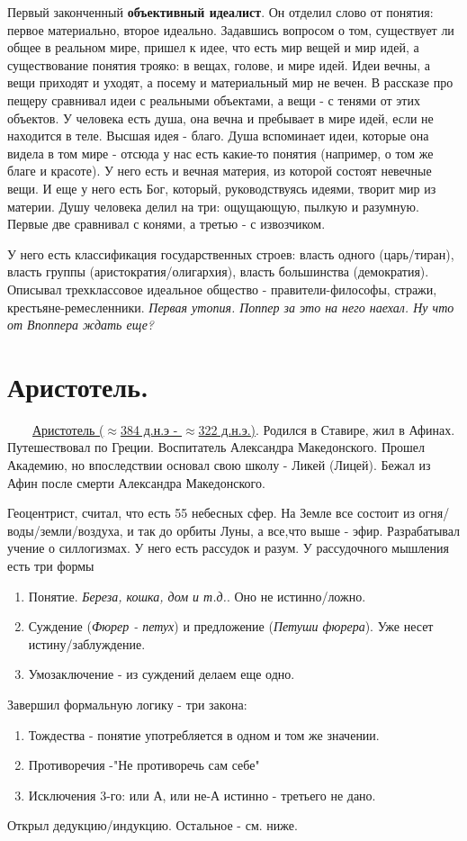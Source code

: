 \documentclass[12pt,a4paper]{article}
\begin{document}
Первый законченный \textbf{объективный идеалист}. Он отделил слово от понятия: первое материально, второе идеально. Задавшись вопросом о том, существует ли общее в реальном мире, пришел к идее, что есть мир вещей и мир идей, а существование понятия трояко: в вещах, голове, и мире идей. Идеи вечны, а вещи приходят и уходят, а посему и материальный мир не вечен. В рассказе про пещеру сравнивал идеи с реальными объектами, а вещи - с тенями от этих объектов. У человека есть душа, она вечна и пребывает в мире идей, если не находится в теле. Высшая идея - благо. Душа вспоминает идеи, которые она видела в том мире - отсюда у нас есть какие-то понятия (например, о том же благе и красоте).
У него есть и вечная материя, из которой состоят невечные вещи. И еще у него есть Бог, который, руководствуясь идеями, творит мир из материи. Душу человека делил на три: ощущающую, пылкую и разумную. Первые две сравнивал с конями, а третью - с извозчиком.

У него есть классификация государственных строев: власть одного (царь/тиран), власть группы (аристократия/олигархия), власть большинства (демократия). Описывал трехклассовое идеальное общество - правители-философы, стражи, крестьяне-ремесленники. \textit{Первая утопия. Поппер за это на него наехал. Ну что от Впоппера ждать еще?}

\section{Аристотель.}
\ \ \ \
\underline{Аристотель ($\approx$384 д.н.э - $\approx$322 д.н.э.)}. Родился в Ставире, жил в Афинах. Путешествовал по Греции. Воспитатель Александра Македонского. Прошел Академию, но впоследствии основал свою школу - Ликей (Лицей). Бежал из Афин после смерти Александра Македонского.

Геоцентрист, считал, что есть 55 небесных сфер. На Земле все состоит из огня/воды/земли/воздуха, и так до орбиты Луны, а все,что выше - эфир. 
Разрабатывал учение о силлогизмах. У него есть рассудок и разум. У рассудочного мышления есть три формы
\begin{enumerate}
\item Понятие. \textit{Береза, кошка, дом и т.д.}. Оно не истинно/ложно.
\item Суждение (\textit{Фюрер - петух}) и предложение (\textit{Петуши фюрера}). Уже несет истину/заблуждение.
\item Умозаключение - из суждений делаем еще одно. 
\end{enumerate}
Завершил формальную логику - три закона:
\begin{enumerate}
\item Тождества - понятие употребляется в одном и том же значении.
\item Противоречия -"Не противоречь сам себе"
\item Исключения 3-го: или А, или не-А истинно - третьего не дано. 
\end{enumerate}
Открыл дедукцию/индукцию.
Остальное - см. ниже.
\end{document}
